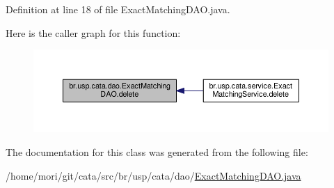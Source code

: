 Definition at line 18 of file Exact\+Matching\+D\+A\+O.\+java.



Here is the caller graph for this function\+:\nopagebreak
\begin{figure}[H]
\begin{center}
\leavevmode
\includegraphics[width=350pt]{classbr_1_1usp_1_1cata_1_1dao_1_1_exact_matching_d_a_o_a64901b8d4e26cfef2f3f2238661e9836_icgraph}
\end{center}
\end{figure}




The documentation for this class was generated from the following file\+:\begin{DoxyCompactItemize}
\item 
/home/mori/git/cata/src/br/usp/cata/dao/\hyperlink{_exact_matching_d_a_o_8java}{Exact\+Matching\+D\+A\+O.\+java}\end{DoxyCompactItemize}
